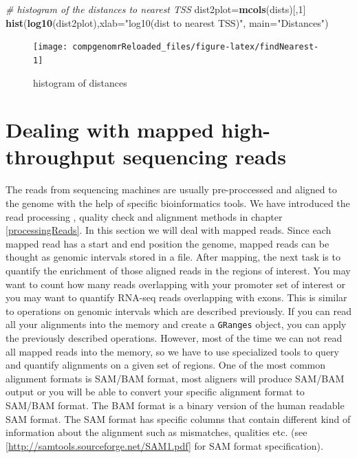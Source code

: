 \documentclass[12pt,]{krantz}
\newenvironment{Shaded}{\begin{snugshade}}{\end{snugshade}}
\newcommand{\CommentTok}[1]{\textcolor[rgb]{0.56,0.35,0.01}{\textit{#1}}}
\newcommand{\DataTypeTok}[1]{\textcolor[rgb]{0.13,0.29,0.53}{#1}}
\newcommand{\DecValTok}[1]{\textcolor[rgb]{0.00,0.00,0.81}{#1}}
\newcommand{\KeywordTok}[1]{\textcolor[rgb]{0.13,0.29,0.53}{\textbf{#1}}}
\newcommand{\NormalTok}[1]{#1}
\newcommand{\StringTok}[1]{\textcolor[rgb]{0.31,0.60,0.02}{#1}}
\begin{document}
\begin{Shaded}
\begin{Highlighting}[]
\CommentTok{# histogram of the distances to nearest TSS}
\NormalTok{dist2plot=}\KeywordTok{mcols}\NormalTok{(dists)[,}\DecValTok{1}\NormalTok{]}
\KeywordTok{hist}\NormalTok{(}\KeywordTok{log10}\NormalTok{(dist2plot),}\DataTypeTok{xlab=}\StringTok{"log10(dist to nearest TSS)"}\NormalTok{,}
     \DataTypeTok{main=}\StringTok{"Distances"}\NormalTok{)}
\end{Highlighting}
\end{Shaded}

\begin{figure}

{\centering \texttt{[image: compgenomrReloaded\_files/figure-latex/findNearest-1]} 

}

\caption{histogram of distances}\label{fig:findNearest}
\end{figure}

\hypertarget{dealing-with-mapped-high-throughput-sequencing-reads}{%
\section{Dealing with mapped high-throughput sequencing reads}\label{dealing-with-mapped-high-throughput-sequencing-reads}}

The reads from sequencing machines are usually pre-proccessed and aligned to the genome with the help of specific bioinformatics tools. We have introduced the read processing , quality check and alignment methods in chapter \ref{processingReads}. In this section we will deal with mapped reads. Since each mapped read has a start and end position the genome, mapped reads can be thought as genomic intervals stored in a file. After mapping, the next task is to quantify the enrichment of those aligned reads in the regions of interest. You may want to count how many reads overlapping with your promoter set of interest or you may want to quantify RNA-seq reads overlapping with exons. This is similar to operations on genomic intervals which are described previously. If you can read all your alignments into the memory and create a \texttt{GRanges} object, you can apply the previously described operations. However, most of the time we can not read all mapped reads into the memory, so we have to use specialized tools to query and quantify alignments on a given set of regions. One of the most common alignment formats is SAM/BAM format, most aligners will produce SAM/BAM output or you will be able to convert your specific alignment format to SAM/BAM format. The BAM format is a binary version of the human readable SAM format. The SAM format has specific columns that contain different kind of information about the alignment such as mismatches, qualities etc. (see {[}\url{http://samtools.sourceforge.net/SAM1.pdf}{]} for SAM format specification).
\end{document}
